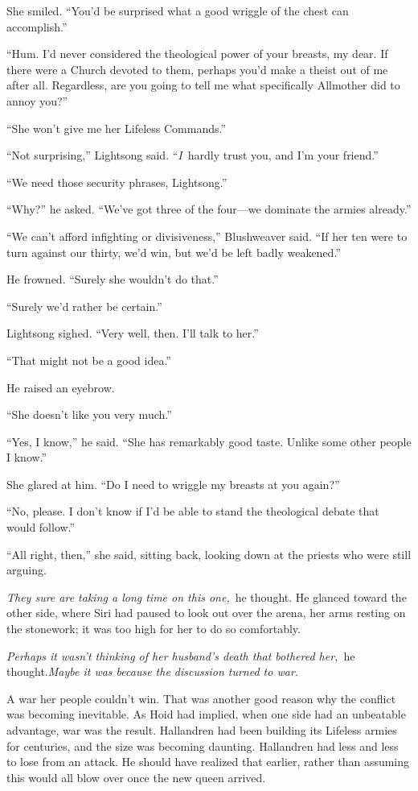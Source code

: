 She smiled. “You’d be surprised what a good wriggle of the chest can accomplish.”

“Hum. I’d never considered the theological power of your breasts, my dear. If there were a Church devoted to them, perhaps you’d make a theist out of me after all. Regardless, are you going to tell me what specifically Allmother did to annoy you?”

“She won’t give me her Lifeless Commands.”

“Not surprising,” Lightsong said. “\textit{I}~hardly trust you, and I’m your friend.”

“We need those security phrases, Lightsong.”

“Why?” he asked. “We’ve got three of the four—we dominate the armies already.”

“We can’t afford infighting or divisiveness,” Blushweaver said. “If her ten were to turn against our thirty, we’d win, but we’d be left badly weakened.”

He frowned. “Surely she wouldn’t do that.”

“Surely we’d rather be certain.”

Lightsong sighed. “Very well, then. I’ll talk to her.”

“That might not be a good idea.”

He raised an eyebrow.

“She doesn’t like you very much.”

“Yes, I know,” he said. “She has remarkably good taste. Unlike some other people I know.”

She glared at him. “Do I need to wriggle my breasts at you again?”

“No, please. I don’t know if I’d be able to stand the theological debate that would follow.”

“All right, then,” she said, sitting back, looking down at the priests who were still arguing.

\textit{They sure are taking a long time on this one,}~he thought. He glanced toward the other side, where Siri had paused to look out over the arena, her arms resting on the stonework; it was too high for her to do so comfortably.

\textit{Perhaps it wasn’t thinking of her husband’s death that bothered her,}~he thought.\textit{Maybe it was because the discussion turned to war.}

A war her people couldn’t win. That was another good reason why the conflict was becoming inevitable. As Hoid had implied, when one side had an unbeatable advantage, war was the result. Hallandren had been building its Lifeless armies for centuries, and the size was becoming daunting. Hallandren had less and less to lose from an attack. He should have realized that earlier, rather than assuming this would all blow over once the new queen arrived.

